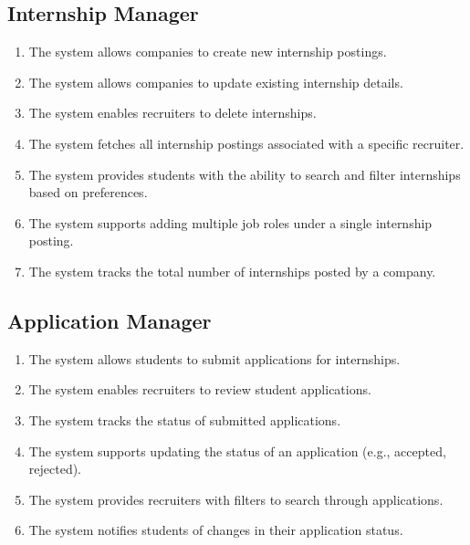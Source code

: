 \subsection{Internship Manager}
\label{subsec:internship_manager}
\begin{enumerate}[label=R\arabic*:, itemsep=0.2em, start=11]
    \item The system allows companies to create new internship postings.
    \item The system allows companies to update existing internship details.
    \item The system enables recruiters to delete internships.
    \item The system fetches all internship postings associated with a specific recruiter.
    \item The system provides students with the ability to search and filter internships based on preferences.
    \item The system supports adding multiple job roles under a single internship posting.
    \item The system tracks the total number of internships posted by a company.
\end{enumerate}

\subsection{Application Manager}
\label{subsec:application_manager}
\begin{enumerate}[label=R\arabic*:, itemsep=0.2em, start=18]
    \item The system allows students to submit applications for internships.
    \item The system enables recruiters to review student applications.
    \item The system tracks the status of submitted applications.
    \item The system supports updating the status of an application (e.g., accepted, rejected).
    \item The system provides recruiters with filters to search through applications.
    \item The system notifies students of changes in their application status.
\end{enumerate}

